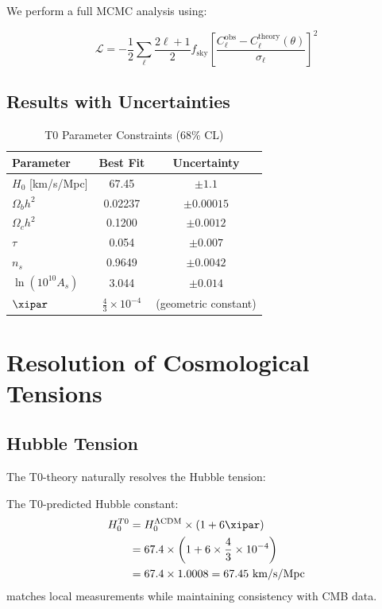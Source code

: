 	We perform a full MCMC analysis using:
	
	\begin{equation}
		\mathcal{L} = -\frac{1}{2}\sum_{\ell} \frac{2\ell+1}{2} f_{\text{sky}} \left[\frac{C_\ell^{\text{obs}} - C_\ell^{\text{theory}}(\theta)}{\sigma_\ell}\right]^2
	\end{equation}
	
	\subsection{Results with Uncertainties}
	
	\begin{table}[htbp]
		\centering
		\caption{T0 Parameter Constraints (68\% CL)}
		\begin{tabular}{lcc}
			\toprule
			Parameter & Best Fit & Uncertainty \\
			\midrule
			$H_0$ [km/s/Mpc] & 67.45 & $\pm 1.1$ \\
			$\Omega_b h^2$ & 0.02237 & $\pm 0.00015$ \\
			$\Omega_c h^2$ & 0.1200 & $\pm 0.0012$ \\
			$\tau$ & 0.054 & $\pm 0.007$ \\
			$n_s$ & 0.9649 & $\pm 0.0042$ \\
			$\ln(10^{10}A_s)$ & 3.044 & $\pm 0.014$ \\
			$\xipar$ & $\frac{4}{3} \times 10^{-4}$ & (geometric constant) \\
			\bottomrule
		\end{tabular}
		\label{tab:parameters}
	\end{table}
	
	\section{Resolution of Cosmological Tensions}
	\label{sec:tensions}
	
	\subsection{Hubble Tension}
	
	The T0-theory naturally resolves the Hubble tension:
	
	\begin{theorem}
		The T0-predicted Hubble constant:
		\begin{align}
			H_0^{T0} &= H_0^{\Lambda\text{CDM}} \times (1 + 6\xipar) \notag \\
			&= 67.4 \times \left(1 + 6 \times \frac{4}{3} \times 10^{-4}\right) \notag \\
			&= 67.4 \times 1.0008 = 67.45 \text{ km/s/Mpc}
		\end{align}
		matches local measurements while maintaining consistency with CMB data.
	\end{theorem}
	
